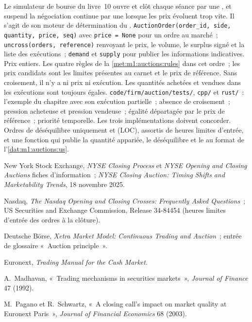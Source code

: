 \begin{build}
 Le simulateur de bourse du livre~10 ouvre et clôt
chaque séance par une , et suspend la négociation continue par une
 lorsque les prix évoluent trop vite. Il s'agit de son moteur de détermination du .  \texttt{AuctionOrder(order\_id, side, quantity, price,
seq)} avec \texttt{price = None} pour un ordre au marché~;
\texttt{uncross(orders, reference)} renvoyant le prix, le volume, le surplus signé
et la liste des exécutions~; \texttt{demand} et \texttt{supply} pour publier
les informations indicatives.
 Prix entiers. Les quatre règles de la \cref{met:m1:auctions:rules}
dans cet ordre~; les prix candidats sont les limites présentes au carnet et le
prix de référence. Sans croisement, il n'y a ni prix ni exécution. Les quantités achetées et vendues
dans les exécutions sont toujours égales.
 \texttt{code/firm/auction/tests/}, \texttt{cpp/} et
\texttt{rust/}~: l'exemple du chapitre avec son exécution partielle~; absence de croisement~; pression acheteuse et
pression vendeuse~; égalité départagée par le prix de référence~; priorité temporelle. Les trois
implémentations doivent concorder.
 Ordres de déséquilibre uniquement et  (LOC), assortis de
heures limites d'entrée, et une fonction qui publie la quantité appariée, le déséquilibre et
le  au format de l'\cref{dat:m1:auctions:us}.
\end{build}

\begin{omsources}
\item New York Stock Exchange, \emph{NYSE Closing Process} et \emph{NYSE
Opening and Closing Auctions} fiches d'information~; \emph{NYSE Closing Auction: Timing
Shifts and Marketability Trends}, 18 novembre 2025.
\item Nasdaq, \emph{The Nasdaq Opening and Closing Crosses: Frequently Asked
Questions}~; US Securities and Exchange Commission, Release 34-84454 (heures
limites d'entrée des ordres à la clôture).
\item Deutsche Börse, \emph{Xetra Market Model: Continuous Trading and
Auction}~; entrée de glossaire «~Auction principle~».
\item Euronext, \emph{Trading Manual for the Cash Market}.
\item A.~Madhavan, «~Trading mechanisms in securities markets~»,
\emph{Journal of Finance} 47 (1992).
\item M.~Pagano et R.~Schwartz, «~A closing call's impact on market
quality at Euronext Paris~», \emph{Journal of Financial Economics} 68
(2003).
\end{omsources}

